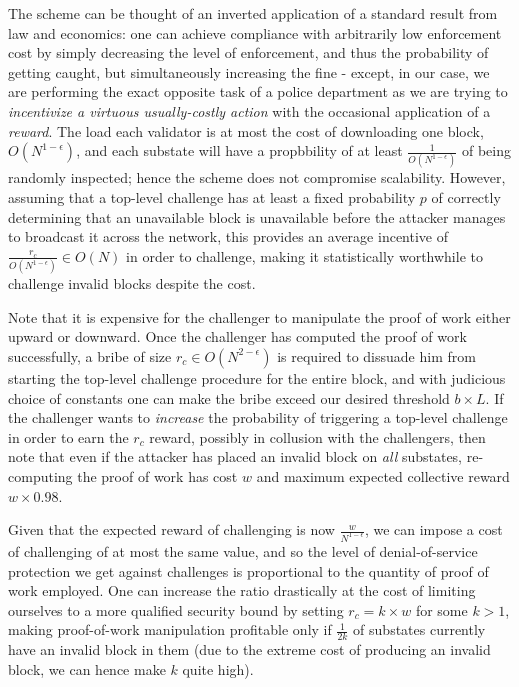\documentclass[11pt,a4paper]{report}
\theoremstyle{plain}
\theoremstyle{definition}
\theoremstyle{remark}
\begin{document}
The scheme can be thought of an inverted application of a standard result from law and economics: one can achieve compliance with arbitrarily low enforcement cost by simply decreasing the level of enforcement, and thus the probability of getting caught, but simultaneously increasing the fine \citep{eide_economics_2006} - except, in our case, we are performing the exact opposite task of a police department as we are trying to \emph{incentivize a virtuous usually-costly action} with the occasional application of a \emph{reward}. The load each validator is at most the cost of downloading one block, $O(N^{1-\epsilon})$, and each substate will have a propbbility of at least $\frac{1}{O(N^{1-\epsilon})}$ of being randomly inspected; hence the scheme does not compromise scalability. However, assuming that a top-level challenge has at least a fixed probability $p$ of correctly determining that an unavailable block is unavailable before the attacker manages to broadcast it across the network, this provides an average incentive of $\frac{r_c}{O(N^{1-\epsilon})} \in O(N)$ in order to challenge, making it statistically worthwhile to challenge invalid blocks despite the cost.

Note that it is expensive for the challenger to manipulate the proof of work either upward or downward. Once the challenger has computed the proof of work successfully, a bribe of size $r_c \in O(N^{2-\epsilon})$ is required to dissuade him from starting the top-level challenge procedure for the entire block, and with judicious choice of constants one can make the bribe exceed our desired threshold $b \times  L$. If the challenger wants to \emph{increase} the probability of triggering a top-level challenge in order to earn the $r_c$ reward, possibly in collusion with the challengers, then note that even if the attacker has placed an invalid block on \emph{all} substates, re-computing the proof of work has cost $w$ and maximum expected collective reward $w \times  0.98$.

Given that the expected reward of challenging is now $\frac{w}{N^{1-\epsilon}}$, we can impose a cost of challenging of at most the same value, and so the level of denial-of-service protection we get against challenges is proportional to the quantity of proof of work employed. One can increase the ratio drastically at the cost of limiting ourselves to a more qualified security bound by setting $r_c = k \times  w$ for some $k > 1$, making proof-of-work manipulation profitable only if $\frac{1}{2k}$ of substates currently have an invalid block in them (due to the extreme cost of producing an invalid block, we can hence make $k$ quite high).
\end{document}
